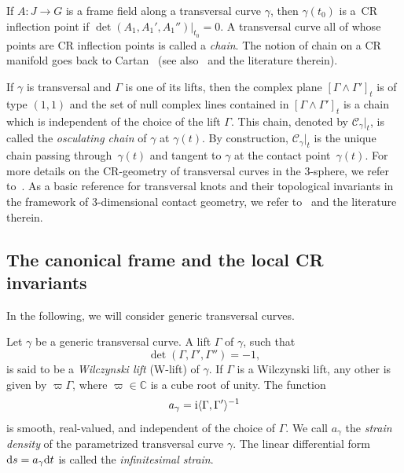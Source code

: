 \documentclass[10pt,a4paper]{amsart}
\numberwithin{equation}{section}
\def\C{\mathbb{C}}
\begin{document}
\begin{Remark}
If $A \colon J \to G$ is a frame field along a transversal curve $\gamma$, then $\gamma({t_0})$ is a~CR inflection point
if $ \det(A_1,A_1',A_1'')\big|_{t_0} = 0$. A transversal curve all of whose points are CR inflection points is
called a \textit{chain}. The notion of chain on a CR manifold goes back to Cartan~\cite{Cartan1932-2, Cartan1932}
(see also~\cite{Jacobo1985} and the literature therein).

 If $\gamma$ is transversal and $\Gamma$ is one of its lifts, then the complex plane $[\Gamma\wedge\Gamma']_{ t}$
 is of type $(1,1)$ and the set of null complex lines contained in $[\Gamma\wedge\Gamma']_{ t}$ is a chain
 which is independent of the choice of the lift $\Gamma$. This chain, denoted by $\mathcal{C}_{ \gamma} |_t$, is
 called the \emph{osculating chain} of $\gamma$ at $\gamma(t)$. By construction, $\mathcal{C}_{ \gamma} |_t$
 is the unique chain passing through~$\gamma(t)$ and tangent to $\gamma$ at the contact point~$\gamma(t)$.
For more details on the {CR}-geometry of transversal curves in the 3-sphere, we refer to~\cite{MNS-Kharkiv}.
{As a basic reference for transversal knots and their topological invariants in the framework of 3-dimensional
contact geometry, we refer to~\cite{Et2} and the literature therein}.
\end{Remark}


\subsection{The canonical frame and the local CR invariants}\label{ss:canonical-frame}

In the following, we will consider generic transversal curves.

\begin{Definition}
Let $\gamma$ be a generic transversal curve. A lift $\Gamma$ of $\gamma$, such that
\[
 \det(\Gamma,\Gamma',\Gamma'')= -1,
\]
is said to be a \emph{Wilczynski lift} (W-lift) of $\gamma$.
%
 If $\Gamma$ is a Wilczynski lift, any other is given by $\varpi\Gamma$, where $\varpi\in\C$
 is a cube root of unity.
 The function
\[
 a_\gamma = {\rm i}\langle\Gamma,\Gamma'\rangle^{-1}
\]
is smooth, real-valued, and independent of the choice of $\Gamma$.
%
We call $a_\gamma$ the \emph{strain density} of the parametrized transversal curve $\gamma$.
The linear differential form ${\rm d}s = a_\gamma {\rm d}t$ is called the \emph{infinitesimal strain}.
\end{Definition}
\end{document}
